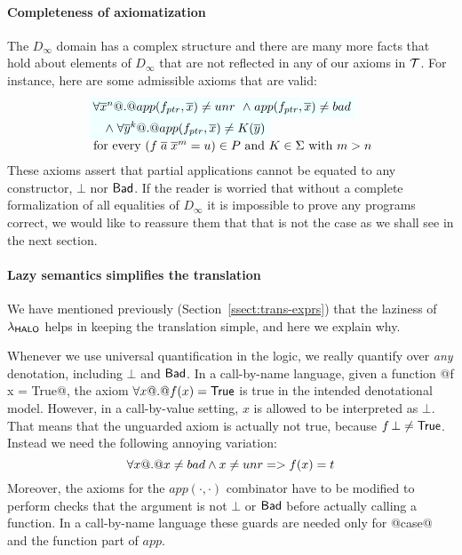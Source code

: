 \paragraph{Completeness of axiomatization}

The $D_\infty$ domain has a complex structure and there are many more facts that
hold about elements of $D_\infty$ that are not reflected in any of our axioms in ${\cal T}$.
For instance, here are some admissible axioms that are valid:
\[\begin{array}{l}
    \formula{\forall \oln{x}{n} @.@ app(f_{ptr},\xs) \neq \unr}
    \formula{\land\; app(f_{ptr},\xs) \neq \bad} \\
    \formula{\quad\land\; \forall \oln{y}{k} @.@ app(f_{ptr},\xs) \neq K(\ol{y})} \\
    \text{ for every } (f\;\ol{a}\;\oln{x}{m} = u) \in P
    \text{ and } K \in \Sigma \text{ with } m > n
\end{array}\]
These axioms assert that partial applications cannot be equated to
any constructor, $\bot$ nor $\mathsf{Bad}$. If the reader is worried that without a
complete formalization of all equalities of $D_\infty$ it is impossible to prove any
programs correct, we would like to reassure them that that is not the case as we
shall see in the next section.

\paragraph{Lazy semantics simplifies the translation}
We have mentioned previously (Section~\ref{ssect:trans-exprs}) that the 
laziness of $\lambda_{\sf HALO}$ helps in keeping the translation simple, and here we 
explain why. 

Whenever we use universal quantification in the logic, we really quantify over
{\em any} denotation, including $\bot$ and $\mathsf{Bad}$. In a call-by-name language, 
given a function @f x = True@, the axiom $\forall x @.@ f(x) = \mathsf{True}$ 
is true in the intended denotational model. However, in a call-by-value setting, $x$ 
is allowed to be interpreted as $\bot$. That means that the unguarded axiom is 
actually not true, because $f\,\bot \not= \mathsf{True}$.
Instead we need the following annoying variation:
\[  \forall x @.@ x \neq bad \land x \neq \mathop{unr} => f(x) = t \]
Moreover, the axioms for the $app(\cdot,\cdot)$ combinator have to be modified
to perform checks that the argument is not $\bot$ or $\mathsf{Bad}$ before actually 
calling a function.   In a call-by-name language these guards are needed 
only for @case@ and the function part of $app$.

